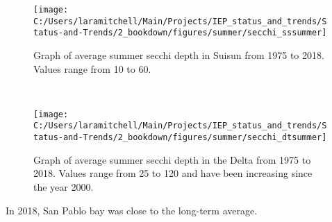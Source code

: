 \documentclass[
]{book}
\begin{document}
\begin{panel-grid}
\begin{columns-nocenter}
\begin{column40}
\end{column40}

\begin{column800}

\begin{expand}

\begin{figure}
\texttt{[image: C:/Users/laramitchell/Main/Projects/IEP\_status\_and\_trends/Status-and-Trends/2\_bookdown/figures/summer/secchi\_sssummer]} \caption{Graph of average summer secchi depth in Suisun from 1975 to 2018. Values range from 10 to 60.}\label{fig:unnamed-chunk-52}
\end{figure}

\end{expand}

\end{column800}

\begin{column40}

~

\end{column40}

\begin{column800}

\begin{expand}

\begin{figure}
\texttt{[image: C:/Users/laramitchell/Main/Projects/IEP\_status\_and\_trends/Status-and-Trends/2\_bookdown/figures/summer/secchi\_dtsummer]} \caption{Graph of average summer secchi depth in the Delta from 1975 to 2018. Values range from 25 to 120 and have been increasing since the year 2000.}\label{fig:unnamed-chunk-53}
\end{figure}

\end{expand}

\end{column800}

\end{columns-nocenter}

\begin{columns-nocenter}

\begin{column800}

In 2018, San Pablo bay was close to the long-term average.

\end{column800}

\begin{column40}


\end{column40}
\end{columns-nocenter}
\end{panel-grid}
\end{document}
